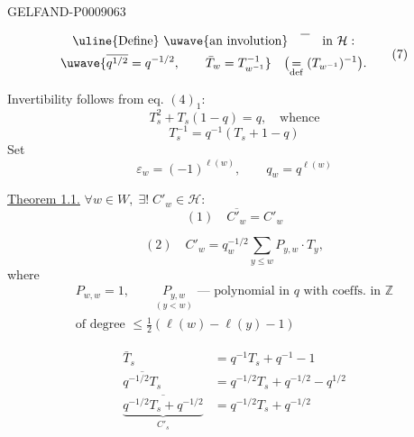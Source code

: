 \begin{GelfandAdjacentEvidence}{GELFAND-P000906}{3}

\begin{equation*}
\begin{gathered}
\text{\uline{Define} \uwave{an involution}}\quad
\overline{\phantom{T}}\quad\text{in }\mathcal H:\\
\text{\uwave{\(\overline{q^{1/2}}=q^{-1/2},\qquad
\bar T_w=T_{w^{-1}}^{-1}\)}}
\quad\bigl(\underset{\mathrm{def}}{=}(T_{w^{-1}})^{-1}\bigr).
\end{gathered}
\tag{7}
\end{equation*}

Invertibility follows from eq. $(4)_1$:
\[
T_s^2+T_s(1-q)=q,\quad\text{whence}
\]
\begin{equation*}
T_s^{-1}=q^{-1}(T_s+1-q)
\tag{8}
\end{equation*}
Set
\begin{equation*}
\varepsilon_w=(-1)^{\ell(w)},\qquad q_w=q^{\ell(w)}
\tag{9}
\end{equation*}

\uline{Theorem 1.1.} \(\forall w\in W,\;\exists!\;C'_w\in\mathcal H:\)
\begin{equation*}
(1)\quad\overline{C'_w}=C'_w
\tag{10}
\end{equation*}

\begin{equation*}
(2)\quad C'_w=q_w^{-1/2}\sum_{y\le w}P_{y,w}\cdot T_y,
\tag{11}
\end{equation*}
where
\begin{equation*}
\begin{gathered}
P_{w,w}=1,\qquad
\underset{(y<w)}{P_{y,w}}\text{ --- polynomial in \(q\) with coeffs. in \(\mathbb Z\)}\\
\text{of degree }\le\frac12(\ell(w)-\ell(y)-1)
\end{gathered}
\tag{12}
\end{equation*}

\begin{align*}
\bar T_s&=q^{-1}T_s+q^{-1}-1\\
\overline{q^{-1/2}T_s}&=q^{-1/2}T_s+q^{-1/2}-q^{1/2}\\
\underbrace{\overline{q^{-1/2}T_s+q^{-1/2}}}_{C'_s}
&=q^{-1/2}T_s+q^{-1/2}
\end{align*}
\end{GelfandAdjacentEvidence}
